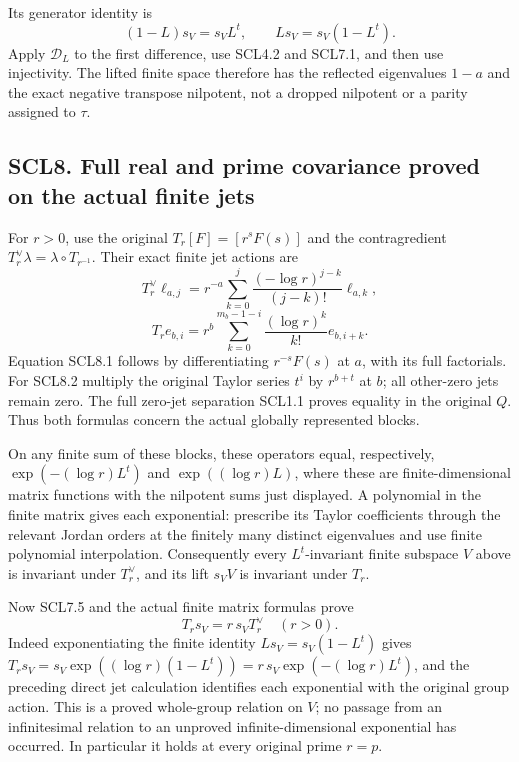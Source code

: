 Its generator identity is \[
 (1-L)s_V=s_V L^t,\qquad
 Ls_V=s_V(1-L^t).
 \tag{SCL7.5}
\] Apply \(\mathcal D_L\) to the first difference, use SCL4.2 and
SCL7.1, and then use injectivity. The lifted finite space therefore has
the reflected eigenvalues \(1-a\) and the exact negative transpose
nilpotent, not a dropped nilpotent or a parity assigned to \(\tau\).

\subsection{SCL8. Full real and prime covariance proved on the actual
finite
jets}\label{scl8.-full-real-and-prime-covariance-proved-on-the-actual-finite-jets}

For \(r>0\), use the original \(T_r[F]=[r^sF(s)]\) and the
contragredient \(T_r^\vee\lambda=\lambda\circ T_{r^{-1}}\). Their exact
finite jet actions are \[
 T_r^\vee\ell_{a,j}
 =r^{-a}\sum_{k=0}^{j}
       \frac{(-\log r)^{j-k}}{(j-k)!}\ell_{a,k},
 \tag{SCL8.1}
\] \[
 T_re_{b,i}
 =r^b\sum_{k=0}^{m_b-1-i}
       \frac{(\log r)^k}{k!}e_{b,i+k}.
 \tag{SCL8.2}
\] Equation SCL8.1 follows by differentiating \(r^{-s}F(s)\) at \(a\),
with its full factorials. For SCL8.2 multiply the original Taylor series
\(t^i\) by \(r^{b+t}\) at \(b\); all other-zero jets remain zero. The
full zero-jet separation SCL1.1 proves equality in the original \(Q\).
Thus both formulas concern the actual globally represented blocks.

On any finite sum of these blocks, these operators equal, respectively,
\(\exp(-(\log r)L^t)\) and \(\exp((\log r)L)\), where these are
finite-dimensional matrix functions with the nilpotent sums just
displayed. A polynomial in the finite matrix gives each exponential:
prescribe its Taylor coefficients through the relevant Jordan orders at
the finitely many distinct eigenvalues and use finite polynomial
interpolation. Consequently every \(L^t\)-invariant finite subspace
\(V\) above is invariant under \(T_r^\vee\), and its lift \(s_VV\) is
invariant under \(T_r\).

Now SCL7.5 and the actual finite matrix formulas prove \[
 \boxed{T_rs_V=r\,s_VT_r^\vee\quad(r>0).}
 \tag{SCL8.3}
\] Indeed exponentiating the finite identity \(Ls_V=s_V(1-L^t)\) gives
\(T_rs_V=s_V\exp((\log r)(1-L^t))
=r\,s_V\exp(-(\log r)L^t)\), and the preceding direct jet calculation
identifies each exponential with the original group action. This is a
proved whole-group relation on \(V\); no passage from an infinitesimal
relation to an unproved infinite-dimensional exponential has occurred.
In particular it holds at every original prime \(r=p\).

